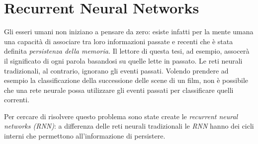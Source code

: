 \documentclass[a4paper,12pt,openright,twoside]{report}
\theoremstyle{definition}
\begin{document}



\section{Recurrent Neural Networks}
Gli esseri umani non iniziano a pensare da zero: esiste infatti per la mente umana una capacità di 
associare tra loro informazioni passate e recenti che è stata definita \emph{persistenza della memoria.} 
Il lettore di questa tesi, ad esempio, assocerà il significato di ogni parola basandosi su quelle 
lette in passato.
Le reti neurali tradizionali, al contrario, ignorano gli eventi passati. Volendo prendere ad esempio 
la classificazione della successione delle scene di un film, non è possibile che una rete neurale 
possa utilizzare gli eventi passati per classificare quelli correnti.

Per cercare di risolvere questo problema sono state create le \emph{recurrent neural networks (RNN)}:
a differenza delle reti neurali tradizionali le \emph{RNN} hanno dei cicli interni che permettono
all'informazione di persistere.
\end{document}

